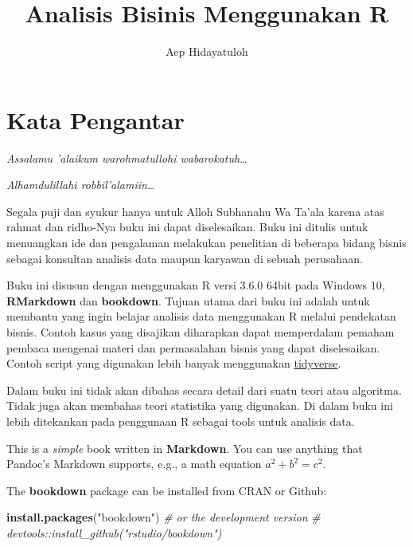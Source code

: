 \documentclass[]{book}
\title{Analisis Bisinis Menggunakan R}
\author{Aep Hidayatuloh}
\date{}
\newenvironment{Shaded}{\begin{snugshade}}{\end{snugshade}}
\newcommand{\CommentTok}[1]{\textcolor[rgb]{0.56,0.35,0.01}{\textit{#1}}}
\newcommand{\KeywordTok}[1]{\textcolor[rgb]{0.13,0.29,0.53}{\textbf{#1}}}
\newcommand{\NormalTok}[1]{#1}
\newcommand{\StringTok}[1]{\textcolor[rgb]{0.31,0.60,0.02}{#1}}
\begin{document}
\maketitle

{
\setcounter{tocdepth}{1}
\tableofcontents
}
\hypertarget{kata-pengantar}{%
\chapter*{Kata Pengantar}\label{kata-pengantar}}

\emph{Assalamu 'alaikum warohmatullohi wabarokatuh\ldots{}}

\emph{Alhamdulillahi robbil'alamiin\ldots{}}

Segala puji dan syukur hanya untuk Alloh Subhanahu Wa Ta'ala karena atas rahmat dan ridho-Nya buku ini dapat diselesaikan. Buku ini ditulis untuk menuangkan ide dan pengalaman melakukan penelitian di beberapa bidang bisnis sebagai konsultan analisis data maupun karyawan di sebuah perusahaan.

Buku ini disusun dengan menggunakan R versi 3.6.0 64bit pada Windows 10, \textbf{RMarkdown} dan \textbf{bookdown}. Tujuan utama dari buku ini adalah untuk membantu yang ingin belajar analisis data menggunakan R melalui pendekatan bisnis. Contoh kasus yang disajikan diharapkan dapat memperdalam pemaham pembaca mengenai materi dan permasalahan bisnis yang dapat diselesaikan. Contoh script yang digunakan lebih banyak menggunakan \href{https://www.tidyverse.org/}{tidyverse}.

Dalam buku ini tidak akan dibahas secara detail dari suatu teori atau algoritma. Tidak juga akan membahas teori statistika yang digunakan. Di dalam buku ini lebih ditekankan pada penggunaan R sebagai tools untuk analisis data.

This is a \emph{simple} book written in \textbf{Markdown}. You can use anything that Pandoc's Markdown supports, e.g., a math equation \(a^2 + b^2 = c^2\).

The \textbf{bookdown} package can be installed from CRAN or Github:

\begin{Shaded}
\begin{Highlighting}[]
\KeywordTok{install.packages}\NormalTok{(}\StringTok{"bookdown"}\NormalTok{)}
\CommentTok{# or the development version}
\CommentTok{# devtools::install_github("rstudio/bookdown")}
\end{Highlighting}
\end{Shaded}
\end{document}
